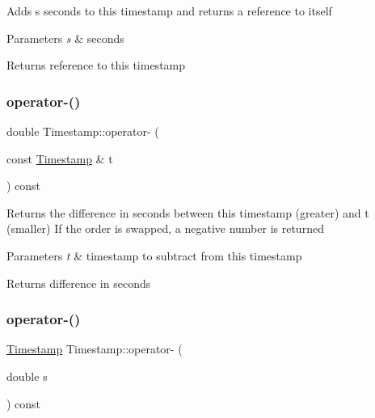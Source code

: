 Adds s seconds to this timestamp and returns a reference to itself 
\begin{DoxyParams}{Parameters}
{\em s} & seconds \\
\hline
\end{DoxyParams}
\begin{DoxyReturn}{Returns}
reference to this timestamp 
\end{DoxyReturn}
\mbox{\label{class_d_utils_1_1_timestamp_ac7f07414867eaa6bea6acd7b41e9f60c}} 
\subsubsection{\texorpdfstring{operator-\/()}{operator-()}\hspace{0.1cm}{\footnotesize\ttfamily [1/2]}}
{\footnotesize\ttfamily double Timestamp\+::operator-\/ (\begin{DoxyParamCaption}\item[{const \mbox{\hyperlink{class_d_utils_1_1_timestamp}{Timestamp}} \&}]{t }\end{DoxyParamCaption}) const}

Returns the difference in seconds between this timestamp (greater) and t (smaller) If the order is swapped, a negative number is returned 
\begin{DoxyParams}{Parameters}
{\em t} & timestamp to subtract from this timestamp \\
\hline
\end{DoxyParams}
\begin{DoxyReturn}{Returns}
difference in seconds 
\end{DoxyReturn}
\mbox{\label{class_d_utils_1_1_timestamp_adfccd22d119468b931e7144ceb9d08da}} 
\subsubsection{\texorpdfstring{operator-\/()}{operator-()}\hspace{0.1cm}{\footnotesize\ttfamily [2/2]}}
{\footnotesize\ttfamily \mbox{\hyperlink{class_d_utils_1_1_timestamp}{Timestamp}} Timestamp\+::operator-\/ (\begin{DoxyParamCaption}\item[{double}]{s }\end{DoxyParamCaption}) const}

